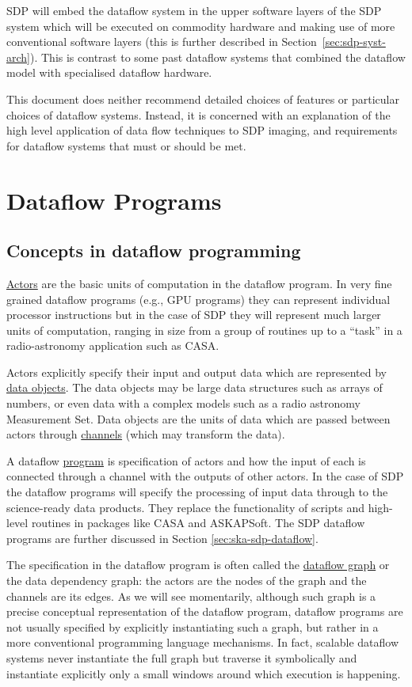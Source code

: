 \documentclass[11pt,a4paper]{article}
\begin{document}
SDP will embed the dataflow system in the upper software layers of the
SDP system which will be executed on commodity hardware and making use
of more conventional software layers (this is further described in
Section~\ref{sec:sdp-syst-arch}). This is contrast to some past
dataflow systems that combined the dataflow model with specialised
dataflow hardware.

This document does neither recommend detailed choices of features or
particular choices of dataflow systems.  Instead, it is concerned with
an explanation of the high level application of data flow techniques
to SDP imaging, and requirements for dataflow systems that must or
should be met.

\section{Dataflow Programs}

\subsection{Concepts in dataflow programming}

\underline{Actors} are the basic units of computation in the dataflow
program. In very fine grained dataflow programs (e.g., GPU programs)
they can represent individual processor instructions but in the case
of SDP they will represent much larger units of computation, ranging
in size from a group of routines up to a ``task'' in a radio-astronomy
application such as CASA.  

Actors explicitly specify their input and output data which are
represented by \underline{data objects}. The data objects may be large
data structures such as arrays of numbers, or even data with a complex
models such as a radio astronomy Measurement Set. Data objects are the
units of data which are passed between actors through
\underline{channels} (which may transform the data).

A dataflow \underline{program} is specification of actors and how the
input of each is connected through a channel with the outputs of other
actors. In the case of SDP the dataflow programs will specify the
processing of input data through to the science-ready data
products. They replace the functionality of scripts and high-level
routines in packages like CASA and ASKAPSoft. The SDP dataflow
programs are further discussed in Section \ref{sec:ska-sdp-dataflow}.

The specification in the dataflow program is often called the
\underline{dataflow graph} or the data dependency graph: the actors
are the nodes of the graph and the channels are its edges. As we will
see momentarily, although such graph is a precise conceptual
representation of the dataflow program, dataflow programs are not
usually specified by explicitly instantiating such a graph, but rather
in a more conventional programming language mechanisms. In fact,
scalable dataflow
\citep{Bosilca6008964,Wozniak:2012:TDD:2443416.2443421} systems never
instantiate the full graph but traverse it symbolically and
instantiate explicitly only a small windows around which execution is
happening.
\end{document}
